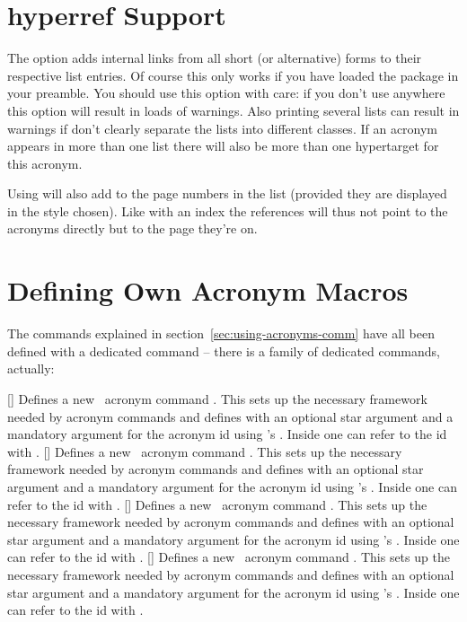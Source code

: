 \documentclass{acro-manual}
\begin{document}
\section{hyperref Support}
The option  adds internal links from all short (or
alternative) forms to their respective list entries.  Of course this only
works if you have loaded the  package in your preamble.  You
should use this option with care: if you don't use  anywhere
this option will result in loads of  warnings.  Also printing
several lists can result in warnings if don't clearly separate the lists into
different classes.  If an acronym appears in more than one list there will
also be more than one hypertarget for this acronym.

Using  will also add  to the page numbers in the
list (provided they are displayed in the style chosen).  Like with an index
the references will thus not point to the acronyms directly but to the page
they're on.

\section{Defining Own Acronym Macros}\label{sec:defining-own-acronym}

The commands explained in
section~\vref{sec:using-acronyms-comm} have all been defined with a dedicated
command -- there is a family of dedicated commands, actually:
\begin{commands}
  []
    Defines a new \acro\ acronym command .  This sets up the
    necessary framework needed by acronym commands and defines  with
    an optional star argument and a mandatory argument for the acronym id
    using 's . Inside  one can
    refer to the \acs{id}  with .
  []
    Defines a new \acro\ acronym command .  This sets up the
    necessary framework needed by acronym commands and defines  with
    an optional star argument and a mandatory argument for the acronym id
    using 's . Inside  one
    can refer to the \acs{id}  with .
  []
    Defines a new \acro\ acronym command .  This sets up the
    necessary framework needed by acronym commands and defines  with
    an optional star argument and a mandatory argument for the acronym id
    using 's . Inside  one
    can refer to the \acs{id}  with .
  []
    Defines a new \acro\ acronym command .  This sets up the
    necessary framework needed by acronym commands and defines  with
    an optional star argument and a mandatory argument for the acronym id
    using 's . Inside  one
    can refer to the \acs{id}  with .
\end{commands}
\end{document}
